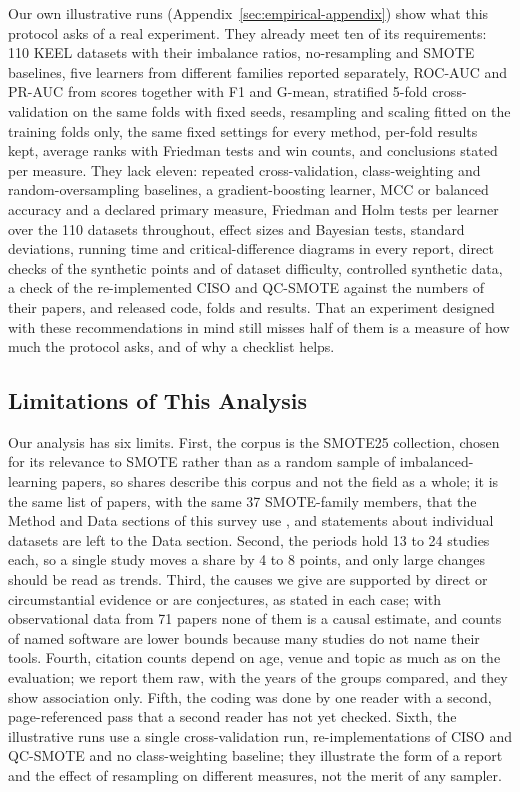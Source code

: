 Our own illustrative runs (Appendix~\ref{sec:empirical-appendix}) show what this protocol asks of a real experiment. They already meet ten of its requirements: 110 KEEL datasets with their imbalance ratios, no-resampling and SMOTE baselines, five learners from different families reported separately, ROC-AUC and PR-AUC from scores together with F1 and G-mean, stratified 5-fold cross-validation on the same folds with fixed seeds, resampling and scaling fitted on the training folds only, the same fixed settings for every method, per-fold results kept, average ranks with Friedman tests and win counts, and conclusions stated per measure. They lack eleven: repeated cross-validation, class-weighting and random-oversampling baselines, a gradient-boosting learner, MCC or balanced accuracy and a declared primary measure, Friedman and Holm tests per learner over the 110 datasets throughout, effect sizes and Bayesian tests, standard deviations, running time and critical-difference diagrams in every report, direct checks of the synthetic points and of dataset difficulty, controlled synthetic data, a check of the re-implemented CISO and QC-SMOTE against the numbers of their papers, and released code, folds and results. That an experiment designed with these recommendations in mind still misses half of them is a measure of how much the protocol asks, and of why a checklist helps.

\subsection{Limitations of This Analysis}
\label{sec:empirical-threats}

Our analysis has six limits. First, the corpus is the SMOTE25 collection, chosen for its relevance to SMOTE rather than as a random sample of imbalanced-learning papers, so shares describe this corpus and not the field as a whole; it is the same list of papers, with the same 37 SMOTE-family members, that the Method and Data sections of this survey use , and statements about individual datasets are left to the Data section. Second, the periods hold 13 to 24 studies each, so a single study moves a share by 4 to 8 points, and only large changes should be read as trends. Third, the causes we give are supported by direct or circumstantial evidence or are conjectures, as stated in each case; with observational data from 71 papers none of them is a causal estimate, and counts of named software are lower bounds because many studies do not name their tools. Fourth, citation counts depend on age, venue and topic as much as on the evaluation; we report them raw, with the years of the groups compared, and they show association only. Fifth, the coding was done by one reader with a second, page-referenced pass that a second reader has not yet checked. Sixth, the illustrative runs use a single cross-validation run, re-implementations of CISO and QC-SMOTE and no class-weighting baseline; they illustrate the form of a report and the effect of resampling on different measures, not the merit of any sampler.
